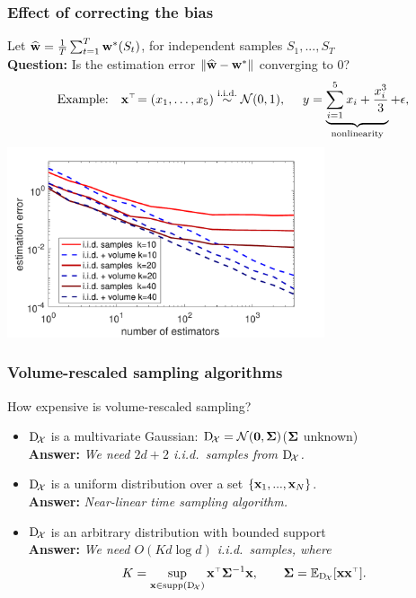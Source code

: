 \documentclass{beamer}
\begin{document}
\begin{frame}
  \frametitle{Effect of correcting the bias}
Let $\widehat{\mathbf w} = \frac1T\sum_{t=1}^T\mathbf w^*(S_t)$, for
  independent samples $S_1,...,S_T$\pause\\[1mm]
\textbf{Question:} Is the estimation error $\|\widehat{\mathbf w}-\mathbf w^*\|$ converging
to 0?\pause
\begin{align*}
\text{Example:}\quad \x^\top\! = (x_1,\dots,x_5)\overset{\text{i.i.d.}}{\sim} \Nc(0,1) ,\quad\ y =
    \underbrace{\sum_{i=1}^5 x_i + \frac{x_i^3}{3}}_{\text{nonlinearity}} +\epsilon,
\end{align*}
  \centering
  \includegraphics[width=0.7\textwidth]{../figs/gaussian}
\end{frame}

\begin{frame}
  \frametitle{Volume-rescaled sampling algorithms}
  How expensive is volume-rescaled sampling?\pause
  \begin{itemize}
  \item $\mathrm{D}_{\!\cal X}$ is a multivariate Gaussian: $\mathrm{D}_{\!\cal X}=\mathcal{N}(\mathbf 0,\mathbf{\Sigma})$\hfill ($\mathbf{\Sigma}$ unknown)\\\pause
    \textbf{Answer:} \textit{We need $2d+2$ i.i.d.~samples from $\mathrm{D}_{\!\cal X}$.}
    \pause
  \item $\mathrm{D}_{\!\cal X}$ is a uniform distribution over a set $\{\mathbf x_1,...,\mathbf x_N\}$.\\\pause
    \textbf{Answer:} \textit{Near-linear time sampling algorithm.}\pause
  \item $\mathrm{D}_{\!\cal X}$ is an arbitrary distribution with bounded support\\\pause
    \textbf{Answer:} \textit{We need $O(Kd\log d)$ i.i.d.~samples, where}
    \begin{align*}
      K = \sup_{\x\in\mathrm{supp}(\dx)}\x^\top\Sigmab^{-1}\x,\qquad \Sigmab=\E_{\dx}[\x\x^\top]. 
    \end{align*}
  \end{itemize}
\end{frame}
\end{document}
